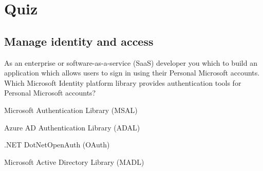 \section{Quiz}
\subsection{Manage identity and access}
As an enterprise or software-as-a-service (SaaS) developer you which to build an application which allows users to sign in using their Personal Microsoft accounts. Which Microsoft Identity platform library provides authentication tools for Personal Microsoft accounts?
\begin{todolist}
\item Microsoft Authentication Library (MSAL)
\item Azure AD Authentication Library (ADAL)
\item .NET DotNetOpenAuth (OAuth)
\item Microsoft Active Directory Library (MADL)
\end{todolist}